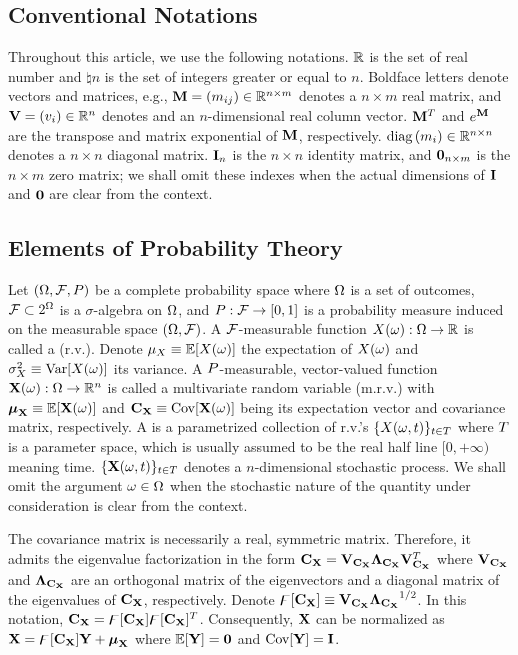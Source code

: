 \subsection{Conventional Notations}
Throughout this article, we use the following notations. $\mathbb{R}$ is the set of real number and $\natural{n}$ is the set of integers greater or equal to $n$. Boldface letters denote vectors and matrices, e.g., $\m{M} = \mtx{m_{ij}} \in \real^{n \times m}$ denotes a $n \times m$ real matrix, and $\mathbf{V} = (v_i) \in \mathbb{R}^n$ denotes and an $n$-dimensional real column vector. $\m{M}^T$ and $e^\m{M}$ are the transpose and matrix exponential of $\m{M}$, respectively. $\text{diag}\left(m_i\right) \in \mathbb{R}^{n \times n}$ denotes a $n \times n$ diagonal matrix. $\mI_n$ is the $n \times n$ identity matrix, and $\mZ_{n \times m}$ is the $n \times m$ zero matrix; we shall omit these indexes when the actual dimensions of $\mI$ and $\mZ$ are clear from the context.

\subsection{Elements of Probability Theory}
Let $(\Omega, \mathcal{F}, P)$ be a complete probability space \cite{durrett2010} where $\Omega$ is a set of outcomes, $\mathcal{F} \subset 2^\Omega$ is a $\sigma$-algebra on $\Omega$, and $P: \mathcal{F} \to [0, 1]$ is a probability measure induced on the measurable space $(\Omega, \mathcal{F})$. A $\mathcal{F}$-measurable function $\rv{X}(\o): \outcomes \to \real$ is called a  (r.v.). Denote $\exp_\rv{X} \eqden \oExp{\rv{X}(\o)}$ the expectation of $\rv{X}(\o)$ and $\var_\rv{X} \eqden \oVar{\rv{X}(\o)}$ its variance. A $P$-measurable, vector-valued function $\mrv{X}(\o): \outcomes \to \real^n$ is called a multivariate random variable (m.r.v.) with $\vExp_\mrv{X} \eqden \oExp{\mrv{X}(\o)}$ and $\mCov_\mrv{X} \eqden \oCov{\mrv{X}(\o)}$ being its expectation vector and covariance matrix, respectively. A  is a parametrized collection of r.v.'s $\{ \rv{X}(\o, \t) \}_{\t \in \sTime}$ where $T$ is a parameter space, which is usually assumed to be the real half line $[0, +\infty)$ meaning time. $\{ \mrv{X}(\o, \t) \}_{\t \in \sTime}$ denotes a $n$-dimensional stochastic process. We shall omit the argument $\omega \in \Omega$ when the stochastic nature of the quantity under consideration is clear from the context.

The covariance matrix is necessarily a real, symmetric matrix. Therefore, it admits the eigenvalue factorization \cite{press2007} in the form $\mCov_\mrv{X} = \m{V}_{\mCov_\mrv{X}} \m{\Lambda}_{\mCov_\mrv{X}} \m{V}_{\mCov_\mrv{X}}^T$ where $\m{V}_{\mCov_\mrv{X}}$ and $\m{\Lambda}_{\mCov_\mrv{X}}$ are an orthogonal matrix of the eigenvectors and a diagonal matrix of the eigenvalues of $\mCov_\mrv{X}$, respectively. Denote $\oEigen{\mCov_\mrv{X}} \eqden \m{V}_{\mCov_\mrv{X}} {\m{\Lambda}_{\mCov_\mrv{X}}}^\ifrac{1}{2}$. In this notation, $\mCov_\mrv{X} = \oEigen{\mCov_\mrv{X}} \oEigen{\mCov_\mrv{X}}^T$. Consequently, $\mrv{X}$ can be normalized as $\mrv{X} = \oEigen{\mCov_\mrv{X}} \mrv{y} + \vExp_\mrv{X}$ where $\oExp{\mrv{y}} = \mZ$ and $\oCov{\mrv{y}} = \mI$.

